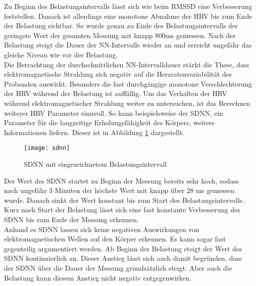Zu Beginn des Belastungsintervalls lässt sich wie beim RMSSD eine Verbesserung feststellen. Danach ist allerdings eine monotone Abnahme der HRV bis zum Ende der Belastung sichtbar. So wurde genau zu Ende des Belastungsintervalls der geringste Wert der gesamten Messung mit knapp 800ms gemessen. Nach der Belastung steigt die Dauer der NN-Intervalle wieder an und erreicht ungefähr das gleiche Niveau wie vor der Belastung. \\
Die Betrachtung der durchschnittlichen NN-Intervalldauer stärkt die These, dass elektromagnetische Strahlung sich negativ auf die Herzratenvariabilität des Probanden auswirkt. Besonders die fast durchgängige monotone Verschlechterung der HRV während der Belastung ist auffällig. Um das Verhalten der HRV während elektromagnetischer Strahlung weiter zu untersuchen, ist das Berechnen weiterer HRV Parameter sinnvoll. So kann beispielsweise der SDNN, ein Parameter für die langzeitige Erholungsfähigkeit des Körpers, weitere Informationen liefern. Dieser ist in Abbildung \ref{fig:sdnn} dargestellt.
\begin{figure}[H]
	\centering
	\texttt{[image: sdnn]}
	\caption{SDNN mit eingezeichnetem Belastungsintervall}
	\label{fig:sdnn}
\end{figure}

Der Wert des SDNN startet zu Beginn der Messung bereits sehr hoch, sodass nach ungefähr 3 Minuten der höchste Wert mit knapp über 28 ms gemessen wurde. Danach sinkt der Wert konstant bis zum Start des Belastungsintervalls. Kurz nach Start der Belastung lässt sich eine fast konstante Verbesserung des SDNN bis zum Ende der Messung erkennen. \\
Anhand es SDNN lassen sich keine negativen Auswirkungen von elektromagnetischen Wellen auf den Körper erkennen. Es kann sogar fast gegenteilig argumentiert werden. Ab Beginn der Belastung steigt der Wert des SDNN kontinuierlich an. Dieser Anstieg lässt sich auch damit begründen, dass der SDNN über die Dauer der Messung grundsätzlich steigt. Aber auch die Belastung kann diesem Anstieg nicht negativ entgegenwirken.  

